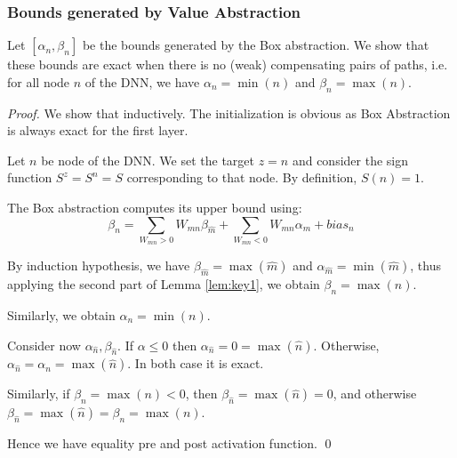 \iffalse
	As direct corollary of Lemma \ref{lem:key1}, we obtain:
	
	\begin{corollary}
		\label{cor1}
		$$\max(c)=\sum_{b \in L, W_{bc}>0}W_{bc} \max(\hat{b}) + \sum_{b \in L, W_{bc}<0}W_{bc} \min(\hat{b}) + bias_c$$
		$$\min(c)=\sum_{b \in L, W_{bc}>0}W_{bc} \min(\hat{b}) + \sum_{b \in L, W_{bc}<0}W_{bc} \max(\hat{b}) + bias_c$$
	\end{corollary}
	
\fi
	
	
	
	
	
	
	\subsubsection*{Bounds generated by Value Abstraction}

	\smallskip
	
	Let $[\alpha_n,\beta_n]$ be the bounds generated by the Box abstraction.
	We show that these bounds are exact when there is no (weak) compensating pairs of paths, i.e. for all node $n$ of the DNN, we have $\alpha_n=\min(n)$ and $\beta_n=\max(n)$.

\begin{proof}
	 We show that inductively. The initialization is obvious as Box Abstraction is always exact for the first layer.

	Let $n$ be node of the DNN. We set the target $z=n$ and consider the sign function $S^z=S^n=S$ corresponding to that node. By definition, $S(n)=1$. 
	
	The Box abstraction computes its upper bound using:
	$$\beta_n= \sum_{W_{mn}>0} W_{mn} \beta_{\hat{m}} + \sum_{W_{mn}<0} W_{mn} \alpha_{\hat{m}} + bias_n$$

	By induction hypothesis, we have 
		$\beta_{\hat{m}}=\max(\hat{m})$ and
		$\alpha_{\hat{m}}=\min(\hat{m})$, thus 
		applying the second part of Lemma \ref{lem:key1}, we obtain
		$\beta_n=\max(n)$.
		
		Similarly, we obtain $\alpha_n=\min(n)$.
		
		Consider now $\alpha_{\hat{n}},\beta_{\hat{n}}$.
		If $\alpha \leq 0$ then $\alpha_{\hat{n}}=0=\max(\hat{n})$.
		Otherwise, $\alpha_{\hat{n}}=\alpha_n=\max(\hat{n})$.
		In both case it is exact.

		Similarly, if $\beta_n=\max(n)<0$, 
		then $\beta_{\hat{n}}=\max(\hat{n})=0$, 
		and otherwise 
		$\beta_{\hat{n}}=\max(\hat{n})=\beta_n=\max(n)$.
		
		Hence we have equality pre and post activation function. \qed

			\end{proof}
	



